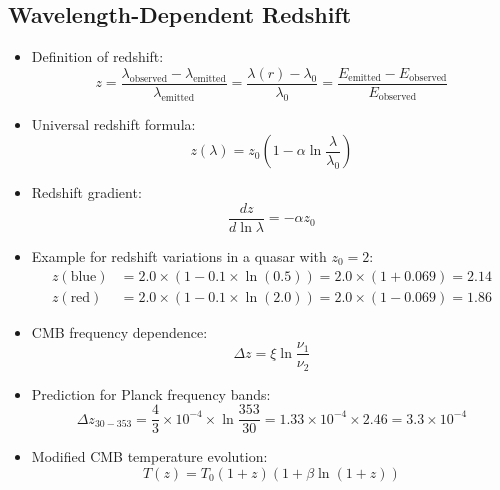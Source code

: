 \documentclass[12pt,a4paper]{article}
\begin{document}
	\subsection{Wavelength-Dependent Redshift}
	\begin{itemize}
		\item Definition of redshift:
		\begin{equation}
			z = \frac{\lambda_{\text{observed}} - \lambda_{\text{emitted}}}{\lambda_{\text{emitted}}} = \frac{\lambda(r) - \lambda_0}{\lambda_0} = \frac{E_{\text{emitted}} - E_{\text{observed}}}{E_{\text{observed}}}
		\end{equation}
		
		\item Universal redshift formula:
		\begin{equation}
			\boxed{z(\lambda) = z_0\left(1 - \alpha \ln\frac{\lambda}{\lambda_0}\right)}
		\end{equation}
		
		\item Redshift gradient:
		\begin{equation}
			\frac{dz}{d\ln\lambda} = -\alpha z_0
		\end{equation}
		
		\item Example for redshift variations in a quasar with $z_0 = 2$:
		\begin{align}
			z(\text{blue}) &= 2.0 \times (1 - 0.1 \times \ln(0.5)) = 2.0 \times (1 + 0.069) = 2.14 \\
			z(\text{red}) &= 2.0 \times (1 - 0.1 \times \ln(2.0)) = 2.0 \times (1 - 0.069) = 1.86
		\end{align}
		
		\item CMB frequency dependence:
		\begin{equation}
			\Delta z = \xi \ln\frac{\nu_1}{\nu_2}
		\end{equation}
		
		\item Prediction for Planck frequency bands:
		\begin{equation}
			\Delta z_{30-353} = \frac{4}{3} \times 10^{-4} \times \ln\frac{353}{30} = 1.33 \times 10^{-4} \times 2.46 = 3.3 \times 10^{-4}
		\end{equation}
		
		\item Modified CMB temperature evolution:
		\begin{equation}
			\boxed{T(z) = T_0(1+z)\left(1 + \beta \ln(1+z)\right)}
		\end{equation}
	\end{itemize}
	
\end{document}
